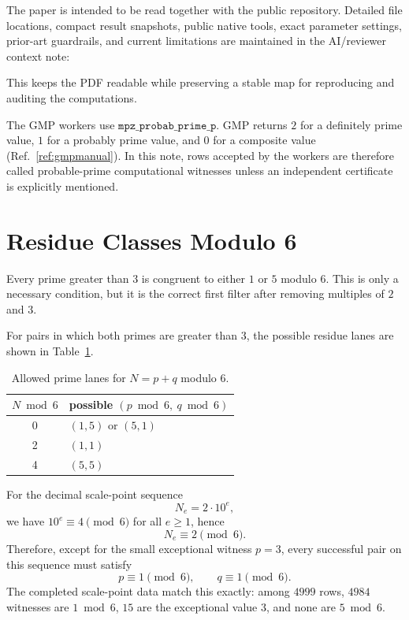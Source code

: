 \documentclass[11pt]{article}
\newcommand{\Ne}{N_e}
\begin{document}
The paper is intended to be read together with the public repository. Detailed
file locations, compact result snapshots, public native tools, exact parameter
settings, prior-art guardrails, and current limitations are maintained in the
AI/reviewer context note:
\begin{center}
  \href{https://github.com/alexkulikovskyus/goldbach-computational-lab/blob/main/docs/ai-context-for-paper.md}{}
\end{center}
This keeps the PDF readable while preserving a stable map for reproducing and
auditing the computations.

The GMP workers use \(\texttt{mpz\_probab\_prime\_p}\). GMP returns \(2\) for
a definitely prime value, \(1\) for a probably prime value, and \(0\) for a
composite value (Ref.~\ref{ref:gmpmanual}). In this note, rows accepted by the
workers are therefore called probable-prime computational witnesses unless an
independent certificate is explicitly mentioned.

\section{Residue Classes Modulo 6}

Every prime greater than \(3\) is congruent to either \(1\) or \(5\) modulo
\(6\). This is only a necessary condition, but it is the correct first filter
after removing multiples of \(2\) and \(3\).

For pairs in which both primes are greater than \(3\), the possible residue
lanes are shown in Table~\ref{tab:lanes}.

\begin{table}[H]
\centering
\caption{Allowed prime lanes for \(N=p+q\) modulo \(6\).}
\label{tab:lanes}
\begin{tabular}{cl}
\toprule
\(N \bmod 6\) & possible \((p\bmod 6,\ q\bmod 6)\) \\
\midrule
0 & \((1,5)\) or \((5,1)\) \\
2 & \((1,1)\) \\
4 & \((5,5)\) \\
\bottomrule
\end{tabular}
\end{table}

For the decimal scale-point sequence
\[
  \Ne=2\cdot10^e,
\]
we have \(10^e\equiv4\pmod6\) for all \(e\ge1\), hence
\[
  \Ne\equiv2\pmod6.
\]
Therefore, except for the small exceptional witness \(p=3\), every successful
pair on this sequence must satisfy
\[
  p\equiv1\pmod6,\qquad q\equiv1\pmod6.
\]
The completed scale-point data match this exactly: among \(4999\) rows,
\(4984\) witnesses are \(1\bmod6\), \(15\) are the exceptional value \(3\),
and none are \(5\bmod6\).
\end{document}
